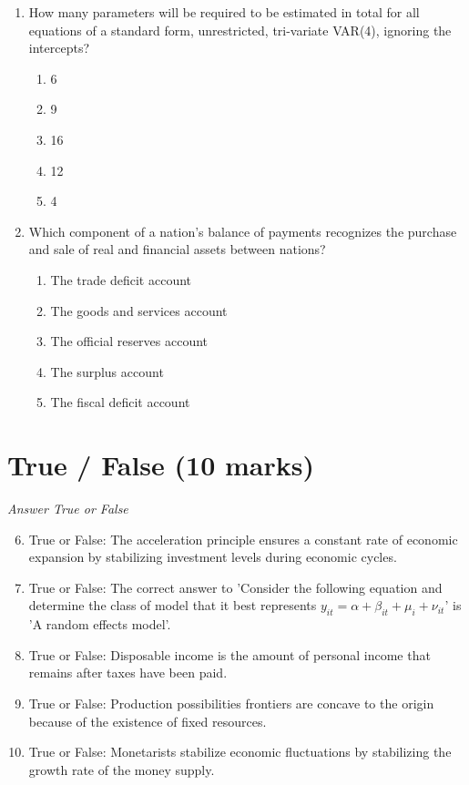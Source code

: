 \documentclass[12pt]{article}
\begin{document}
\begin{enumerate}[label=\arabic*.]
\begin{enumerate}[label=(\alph*)]
    \item Yes, it specifically applies to trade agreements between neighboring countries.
    \item No, it applies wherever productive units have different relative efficiencies.
    \item Yes, it only applies to international trade.
\end{enumerate}
\item How many parameters will be required to be estimated in total for all equations of a standard form, unrestricted, tri-variate VAR(4), ignoring the intercepts?
\begin{enumerate}[label=(\alph*)]
    \item 6
    \item 9
    \item 16
    \item 12
    \item 4
\end{enumerate}
\item Which component of a nation's balance of payments recognizes the purchase and sale of real and financial assets between nations?
\begin{enumerate}[label=(\alph*)]
    \item The trade deficit account
    \item The goods and services account
    \item The official reserves account
    \item The surplus account
    \item The fiscal deficit account
\end{enumerate}
\end{enumerate}

\section*{True / False (10 marks)}
\textit{Answer True or False}
\begin{enumerate}[label=\arabic*.]
\setcounter{enumi}{5}
\item True or False: The acceleration principle ensures a constant rate of economic expansion by stabilizing investment levels during economic cycles.
\item True or False: The correct answer to 'Consider the following equation and determine the class of model that it best represents $y_{it} = \alpha + \beta_{it} + \mu_i + \nu_{it}$' is 'A random effects model'.
\item True or False: Disposable income is the amount of personal income that remains after taxes have been paid.
\item True or False: Production possibilities frontiers are concave to the origin because of the existence of fixed resources.
\item True or False: Monetarists stabilize economic fluctuations by stabilizing the growth rate of the money supply.
\end{enumerate}
\end{document}
